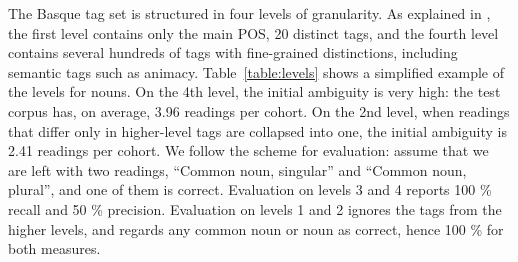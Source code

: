 {{The Basque tag set is structured in four levels of granularity.  As
explained in \citet{ezeiza1998basque}, the first level contains only
the main POS, 20 distinct tags, and the fourth level contains several
hundreds of tags with fine-grained distinctions, including semantic
tags such as animacy.  Table~\ref{table:levels} shows a simplified
example of the levels for nouns.  On the 4th level, the initial
ambiguity is very high: the test corpus has, on average, 3.96 readings
per cohort. On the 2nd level, when readings that differ only in
higher-level tags are collapsed into one, the initial ambiguity is
2.41 readings per cohort.  We follow the scheme for evaluation: assume
that we are left with two readings, ``Common noun, singular'' and
``Common noun, plural'', and one of them is correct. Evaluation on
levels 3 and 4 reports 100 \% recall and 50 \% precision.  Evaluation
on levels 1 and 2 ignores the tags from the higher levels, and regards
any common noun or noun as correct, hence 100 \% for both measures.


\begin{table}[t]
\centering
{}
\end{table}}}
